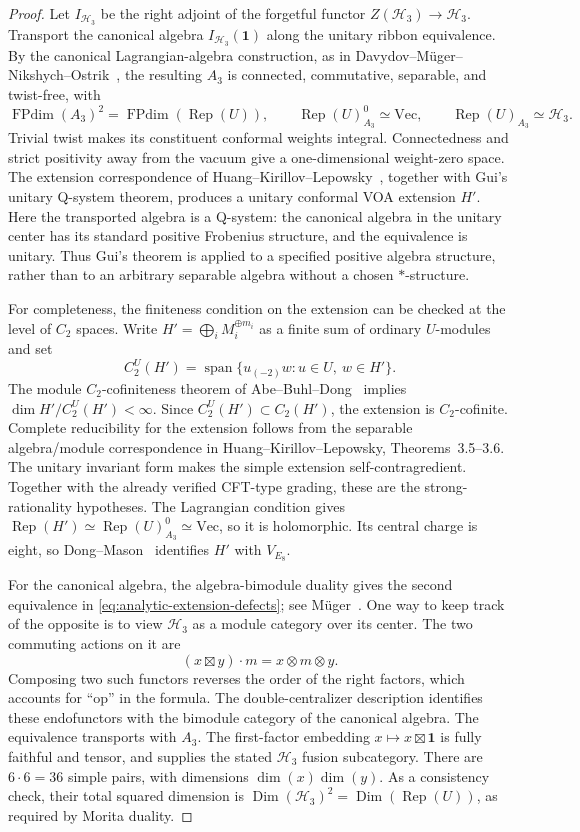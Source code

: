 \documentclass[11pt,a4paper]{article}
\theoremstyle{definition}
\DeclareMathOperator{\Rep}{Rep}
\DeclareMathOperator{\FPdim}{FPdim}
\renewcommand{\Vec}{\mathrm{Vec}}
\newcommand{\HH}{\mathcal H}
\begin{document}
\begin{proof}
Let $I_{\HH_3}$ be the right adjoint of the forgetful functor
$Z(\HH_3)\to\HH_3$.  Transport the canonical algebra
$I_{\HH_3}(\mathbf1)$ along the unitary ribbon equivalence.  By the
canonical Lagrangian-algebra construction, as in
Davydov--M\"uger--Nikshych--Ostrik~\cite[Corollary~4.1 and
Proposition~4.4]{DMNO}, the resulting $A_3$
is connected, commutative, separable, and twist-free, with
\[
 \FPdim(A_3)^2=\FPdim(\Rep(U)),
 \qquad \Rep(U)_{A_3}^{0}\simeq\Vec,
 \qquad \Rep(U)_{A_3}\simeq\HH_3.
\]
Trivial twist makes its constituent conformal weights integral.
Connectedness and strict positivity away from the vacuum give a
one-dimensional weight-zero space.  The extension correspondence of
Huang--Kirillov--Lepowsky~\cite[Theorems~3.2--3.6]{HKL}, together with Gui's
unitary Q-system theorem, produces a unitary conformal VOA extension
$H'$.  Here the transported algebra is a Q-system: the canonical
algebra in the unitary center has its standard positive Frobenius
structure, and the equivalence is unitary.  Thus Gui's theorem is
applied to a specified positive algebra structure, rather than
to an arbitrary separable algebra without a chosen $*$-structure.

For completeness, the finiteness condition on the extension can be
checked at the level of $C_2$ spaces.  Write
$H'=\bigoplus_i M_i^{\oplus m_i}$ as a finite sum of ordinary
$U$-modules and set
\[
 C_2^U(H')=\operatorname{span}\{u_{(-2)}w:u\in U,\ w\in H'\}.
\]
The module $C_2$-cofiniteness theorem of
Abe--Buhl--Dong~\cite[Proposition~5.2]{ABD} implies
$\dim H'/C_2^U(H')<\infty$.  Since
$C_2^U(H')\subset C_2(H')$, the extension is $C_2$-cofinite.
Complete reducibility for the extension follows from the separable
algebra/module correspondence in Huang--Kirillov--Lepowsky,
Theorems~3.5--3.6.  The unitary invariant form makes the simple
extension self-contragredient.  Together with the already verified
CFT-type grading, these are the strong-rationality hypotheses.
The Lagrangian condition gives
$\Rep(H')\simeq\Rep(U)_{A_3}^0\simeq\Vec$, so it is holomorphic.
Its central charge is eight, so
Dong--Mason~\cite[Theorem~1]{DM} identifies $H'$ with $V_{E_8}$.

For the canonical algebra, the algebra-bimodule duality gives the
second equivalence in \eqref{eq:analytic-extension-defects}; see
M\"uger~\cite[Sections~4 and~8]{Mueger}.  One way to keep track of the opposite
is to view $\HH_3$ as a module category over its center.  The two
commuting actions on it are
\[
 (x\boxtimes y)\cdot m=x\otimes m\otimes y.
\]
Composing two such functors reverses the order of the right factors,
which accounts for ``op'' in the formula.  The double-centralizer
description identifies these endofunctors with the bimodule category
of the canonical algebra.  The equivalence transports with $A_3$.
The first-factor embedding $x\mapsto x\boxtimes\mathbf1$ is fully
faithful and tensor, and supplies the stated $\HH_3$ fusion subcategory.
There are $6\cdot6=36$ simple pairs, with dimensions
$\dim(x)\dim(y)$.  As a consistency check, their total squared
dimension is $\operatorname{Dim}(\HH_3)^2
=\operatorname{Dim}(\Rep(U))$, as required by Morita duality.
\end{proof}
\end{document}
